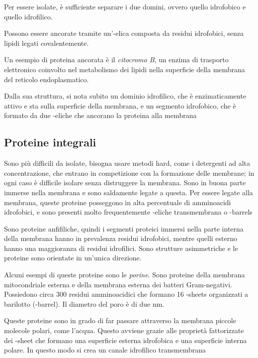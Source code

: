 Per essere isolate, è sufficiente separare i due domini, ovvero quello idrofobico e quello idrofilico.

Possono essere ancorate tramite un'\alpha-elica composta da residui idrofobici, senza lipidi legati covalentemente.

Un esempio di proteina ancorata è il \emph{citocromo B}, un enzima di trasporto elettronico coinvolto nel metabolismo dei lipidi nella superficie della membrana del reticolo endoplasmatico.

Dalla sua struttura, si nota subito un dominio idrofilico, che è enzimaticamente attivo e sta sulla superficie della membrana, e un segmento idrofobico, che è formato da due \alpha-eliche che ancorano la proteina alla membrana


\subsection{Proteine integrali}

Sono più difficili da isolate, bisogna usare metodi hard, come i detergenti ad alta concentrazione, che entrano in competizione con la formazione delle membrane; in ogni caso è difficile isolare senza distruggere la membrana.
Sono in buona parte immerse nella membrana e sono saldamente legate a questa. Per essere legate alla membrana, queste proteine posseggono in alta percentuale di amminoacidi idrofobici, e sono presenti molto frequentemente \alpha-eliche transmembrana o \beta-barrels

Sono proteine anfifiliche, quindi i segmenti proteici immersi nella parte interna della membrana hanno in prevalenza residui idrofobici, mentre quelli esterno hanno una maggioranza di residui idrofilici.
Sono strutture asimmetriche e le proteine sono orientate in un'unica direzione.


Alcuni esempi di queste proteine sono le \emph{porine}. Sono proteine della membrana mitocondriale esterna e della membrana esterna dei batteri Gram-negativi. Possiedono circa 300 residui amminoacidici che formano 16 \beta-sheets organizzati a barilotto (\beta-barrel). Il diametro del poro è di due nm.

Queste proteine sono in grado di far passare attraverso la membrana piccole molecole polari, come l'acqua. Questo avviene grazie alle proprietà fattorizzate dei \beta-sheet che formano una superficie esterna idrofobica e una superficie interna polare. In questo modo si crea un canale idrofilico transmembrana

